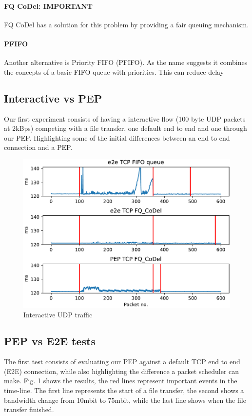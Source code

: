\documentclass[a4paper,english, 11pt]{report}
\begin{document}
\paragraph{FQ CoDel: IMPORTANT}
FQ CoDel has a solution for this problem by providing a fair queuing mechanism. 
\paragraph{PFIFO}
Another alternative is Priority FIFO (PFIFO). As the name suggests it combines the concepts of a basic FIFO queue with priorities. This can reduce delay



\subsection{Interactive vs PEP}
Our first experiment consists of having a interactive flow (100 byte UDP packets at 2kBps) competing with a file transfer, one default end to end and one through our PEP. Highlighting some of the initial differences between an end to end connection and a PEP.\\


\begin{figure}[h] %
	\centering
	\includegraphics[scale=0.50]{../diagrams/graphs/initial_udp_latency_timeseries.pdf}
  	\caption{Interactive UDP traffic}
  	\label{fig:inital_test}
\end{figure}

\subsection{PEP vs E2E tests}
The first test consists of evaluating our PEP against a default TCP end to end (E2E) connection, while also highlighting the difference a packet scheduler can make. Fig. \ref{fig:inital_test} shows the results, the red lines represent important events in the time-line.
The first line represents the start of a file transfer, the second shows a bandwidth change from 10mbit to 75mbit, while the last line shows when the file transfer finished.\\ 
\end{document}

